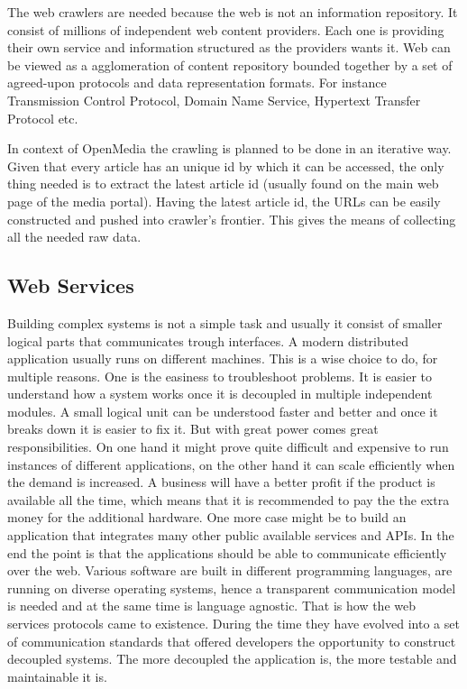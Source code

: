 The web crawlers are needed because the web is not an information repository. It consist of millions of independent web content providers. Each one is providing their own service and information structured as the providers wants it. Web can be viewed as a agglomeration of content repository bounded together by a set of agreed-upon protocols and data representation formats. For instance Transmission Control Protocol, Domain Name Service, Hypertext Transfer Protocol etc.

In context of OpenMedia the crawling is planned to be done in an iterative way. Given that every article has an unique id by which it can be accessed, the only thing needed is to extract the latest article id (usually found on the main web page of the media portal). Having the latest article id, the URLs can be easily constructed and pushed into crawler's frontier. This gives the means of collecting all the needed raw data.

\subsection{Web Services}
Building complex systems is not a simple task and usually it consist of smaller logical parts that communicates trough interfaces. A modern distributed application usually runs on different machines. This is a wise choice to do, for multiple reasons. One is the easiness to troubleshoot problems. It is easier to understand how a system works once it is decoupled in multiple independent modules. A small logical unit can be understood faster and better and once it breaks down it is easier to fix it. But with great power comes great responsibilities. On one hand it might prove quite difficult and expensive to run instances of different applications, on the other hand it can scale efficiently when the demand is increased. A business will have a better profit if the product is available all the time, which means that it is recommended to pay the the extra money for the additional hardware. One more case might be to build an application that integrates many other public available services and APIs. In the end the point is that the applications should be able to communicate efficiently over the web. Various software are built in different programming languages, are running on diverse operating systems, hence a transparent communication model is needed and at the same time is language agnostic. That is how the web services protocols came to existence. During the time they have evolved into a set of communication standards that offered developers the opportunity to construct decoupled systems. The more decoupled the application is, the more testable and maintainable it is.


